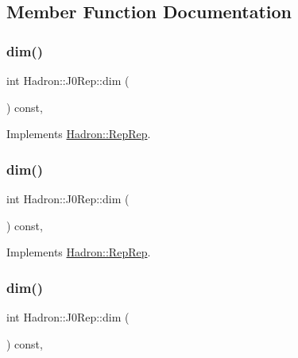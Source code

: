 \subsection{Member Function Documentation}
\mbox{\label{structHadron_1_1J0Rep_a99c9a3c8bac7e89e8f393fdd0cdd8c64}} 
\subsubsection{\texorpdfstring{dim()}{dim()}\hspace{0.1cm}{\footnotesize\ttfamily [1/5]}}
{\footnotesize\ttfamily int Hadron\+::\+J0\+Rep\+::dim (\begin{DoxyParamCaption}{ }\end{DoxyParamCaption}) const\hspace{0.3cm}{\ttfamily [inline]}, {\ttfamily [virtual]}}



Implements \mbox{\hyperlink{structHadron_1_1RepRep_a92c8802e5ed7afd7da43ccfd5b7cd92b}{Hadron\+::\+Rep\+Rep}}.

\mbox{\label{structHadron_1_1J0Rep_a99c9a3c8bac7e89e8f393fdd0cdd8c64}} 
\subsubsection{\texorpdfstring{dim()}{dim()}\hspace{0.1cm}{\footnotesize\ttfamily [2/5]}}
{\footnotesize\ttfamily int Hadron\+::\+J0\+Rep\+::dim (\begin{DoxyParamCaption}{ }\end{DoxyParamCaption}) const\hspace{0.3cm}{\ttfamily [inline]}, {\ttfamily [virtual]}}



Implements \mbox{\hyperlink{structHadron_1_1RepRep_a92c8802e5ed7afd7da43ccfd5b7cd92b}{Hadron\+::\+Rep\+Rep}}.

\mbox{\label{structHadron_1_1J0Rep_a99c9a3c8bac7e89e8f393fdd0cdd8c64}} 
\subsubsection{\texorpdfstring{dim()}{dim()}\hspace{0.1cm}{\footnotesize\ttfamily [3/5]}}
{\footnotesize\ttfamily int Hadron\+::\+J0\+Rep\+::dim (\begin{DoxyParamCaption}{ }\end{DoxyParamCaption}) const\hspace{0.3cm}{\ttfamily [inline]}, {\ttfamily [virtual]}}



